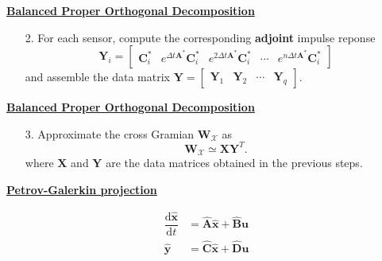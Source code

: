 \documentclass[aspectratio=169, usenames, dvipsnames]{beamer}
\begin{document}
\begin{frame}
  \vfill

  \centering
  \underline{\textbf{Balanced Proper Orthogonal Decomposition}}

  \vfill

  \begin{enumerate}
    \item[2.] For each sensor, compute the corresponding \textbf{adjoint} impulse reponse
    \[
    \bm{Y}_i
    =
    \begin{bmatrix}
      \bm{C}^*_i & e^{\Delta t \bm{A}^*} \bm{C}^*_i & e^{2\Delta t \bm{A}^*} \bm{C}^*_i & \cdots & e^{n \Delta t \bm{A}^*} \bm{C}_i^*
    \end{bmatrix}
    \]
    and assemble the data matrix $\bm{Y} = \begin{bmatrix} \bm{Y}_1 & \bm{Y}_2 & \cdots & \bm{Y}_q \end{bmatrix}$.
  \end{enumerate}

  \vfill
\end{frame}


\begin{frame}
  \vfill

  \centering
  \underline{\textbf{Balanced Proper Orthogonal Decomposition}}

  \vfill

  \begin{enumerate}
    \item[3.] Approximate the cross Gramian $\bm{W}_{\mathcal{X}}$ as
    \[
    \bm{W}_{\mathcal{X}} \simeq \bm{XY}^T.
    \]
    where $\bm{X}$ and $\bm{Y}$ are the data matrices obtained in the previous steps.
  \end{enumerate}

  \vfill
\end{frame}

\begin{frame}
  \vfill

  \centering
  \underline{\textbf{Petrov-Galerkin projection}}

  \Large
  \[
  \begin{aligned}
    \dfrac{\mathrm{d} \hat{\bm{x}}}{\mathrm{d}t} & = \hat{\bm{A}} \hat{\bm{x}} + \hat{\bm{B}} \bm{u} \\
    \hat{\bm{y}} & = \hat{\bm{C}} \hat{\bm{x}} + \hat{\bm{D}} \bm{u}
  \end{aligned}
  \]

  \vfill
\end{frame}
\end{document}
